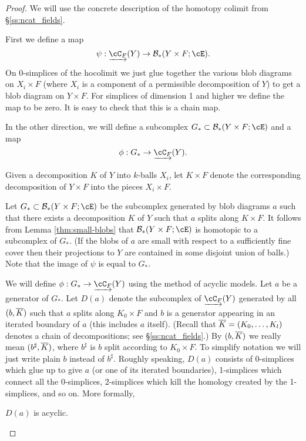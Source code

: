 \begin{proof}
We will use the concrete description of the homotopy colimit from \S\ref{ss:ncat_fields}.

First we define a map 
\[
	\psi: \cl{\cC_F}(Y) \to \bc_*(Y\times F;\cE) .
\]
On 0-simplices of the hocolimit 
we just glue together the various blob diagrams on $X_i\times F$
(where $X_i$ is a component of a permissible decomposition of $Y$) to get a blob diagram on
$Y\times F$.
For simplices of dimension 1 and higher we define the map to be zero.
It is easy to check that this is a chain map.

In the other direction, we will define a subcomplex $G_*\sub \bc_*(Y\times F;\cE)$
and a map
\[
	\phi: G_* \to \cl{\cC_F}(Y) .
\]

Given a decomposition $K$ of $Y$ into $k$-balls $X_i$, let $K\times F$ denote the corresponding
decomposition of $Y\times F$ into the pieces $X_i\times F$.

Let $G_*\sub \bc_*(Y\times F;\cE)$ be the subcomplex generated by blob diagrams $a$ such that there
exists a decomposition $K$ of $Y$ such that $a$ splits along $K\times F$.
It follows from Lemma \ref{thm:small-blobs} that $\bc_*(Y\times F; \cE)$ 
is homotopic to a subcomplex of $G_*$.
(If the blobs of $a$ are small with respect to a sufficiently fine cover then their
projections to $Y$ are contained in some disjoint union of balls.)
Note that the image of $\psi$ is equal to $G_*$.

We will define $\phi: G_* \to \cl{\cC_F}(Y)$ using the method of acyclic models.
Let $a$ be a generator of $G_*$.
Let $D(a)$ denote the subcomplex of $\cl{\cC_F}(Y)$ generated by all $(b, \overline{K})$
such that $a$ splits along $K_0\times F$ and $b$ is a generator appearing
in an iterated boundary of $a$ (this includes $a$ itself).
(Recall that $\overline{K} = (K_0,\ldots,K_l)$ denotes a chain of decompositions;
see \S\ref{ss:ncat_fields}.)
By $(b, \overline{K})$ we really mean $(b^\sharp, \overline{K})$, where $b^\sharp$ is 
$b$ split according to $K_0\times F$.
To simplify notation we will just write plain $b$ instead of $b^\sharp$.
Roughly speaking, $D(a)$ consists of 0-simplices which glue up to give
$a$ (or one of its iterated boundaries), 1-simplices which connect all the 0-simplices, 
2-simplices which kill the homology created by the 
1-simplices, and so on.
More formally,
 
\begin{lemma} \label{lem:d-a-acyclic}
$D(a)$ is acyclic.
\end{lemma}


\end{proof}
